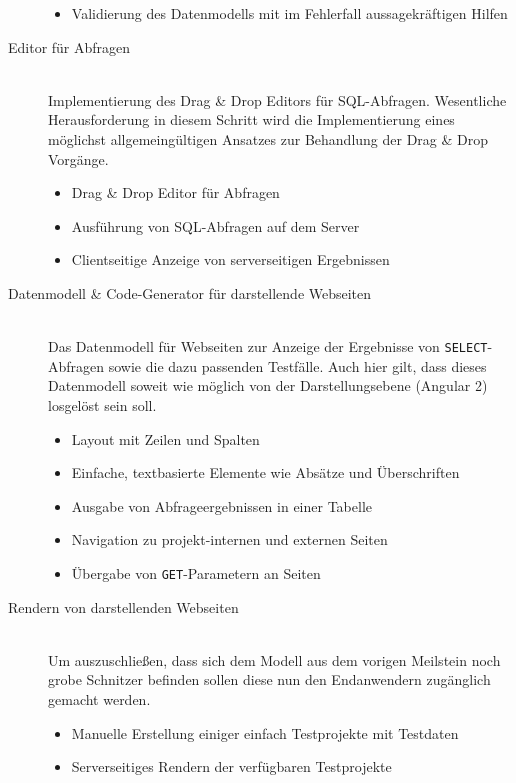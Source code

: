 \begin{description}
\begin{itemize}
  \item Validierung des Datenmodells mit im Fehlerfall aussagekräftigen Hilfen
  \end{itemize}
\item [Editor für Abfragen] \hfill \\
  Implementierung des Drag \& Drop Editors für SQL-Abfragen. Wesentliche Herausforderung in diesem Schritt wird die Implementierung eines möglichst allgemeingültigen Ansatzes zur Behandlung der Drag \& Drop Vorgänge.
  \begin{itemize}
  \item Drag \& Drop Editor für Abfragen
  \item Ausführung von SQL-Abfragen auf dem Server
  \item Clientseitige Anzeige von serverseitigen Ergebnissen
  \end{itemize}
\item [Datenmodell \& Code-Generator für darstellende Webseiten] \hfill \\
  Das Datenmodell für Webseiten zur Anzeige der Ergebnisse von \texttt{SELECT}-Abfragen sowie die dazu passenden Testfälle. Auch hier gilt, dass dieses Datenmodell soweit wie möglich von der Darstellungsebene (Angular 2) losgelöst sein soll.
  \begin{itemize}
  \item Layout mit Zeilen und Spalten
  \item Einfache, textbasierte Elemente wie Absätze und Überschriften
  \item Ausgabe von Abfrageergebnissen in einer Tabelle
  \item Navigation zu projekt-internen und externen Seiten
  \item Übergabe von \texttt{GET}-Parametern an Seiten
  \end{itemize}

\item [Rendern von darstellenden Webseiten] \hfill \\
  Um auszuschließen, dass sich dem Modell aus dem vorigen Meilstein noch grobe Schnitzer befinden sollen diese nun den Endanwendern zugänglich gemacht werden.
  \begin{itemize}
  \item Manuelle Erstellung einiger einfach Testprojekte mit Testdaten
  \item Serverseitiges Rendern der verfügbaren Testprojekte
  \end{itemize}
  

\end{description}
